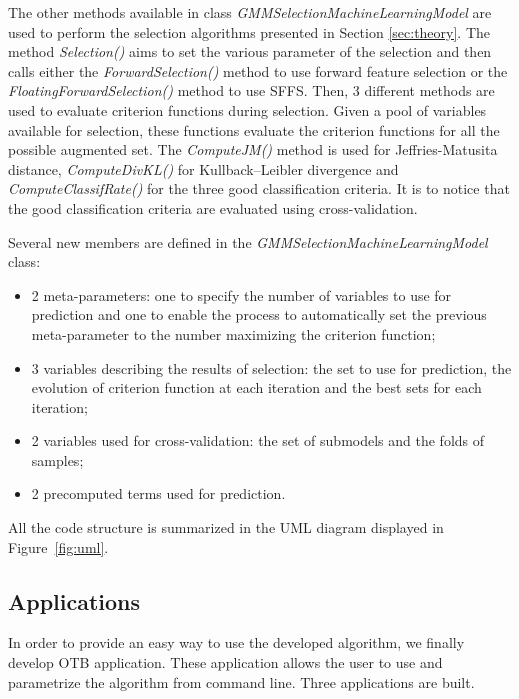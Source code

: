 \documentclass[a4paper,11pt,DIV=16]{scrartcl}
\begin{document}
        The other methods available in class \emph{GMMSelectionMachineLearningModel} are used to perform the selection algorithms presented in Section \ref{sec:theory}. The method \emph{Selection()} aims to set the various parameter of the selection and then calls either the \emph{ForwardSelection()} method to use forward feature selection or the \emph{FloatingForwardSelection()} method to use SFFS. Then, 3 different methods are used to evaluate criterion functions during selection. Given a pool of variables available for selection, these functions evaluate the criterion functions for all the possible augmented set. The \emph{ComputeJM()} method is used for Jeffries-Matusita distance, \emph{ComputeDivKL()} for Kullback–Leibler divergence and \emph{ComputeClassifRate()} for the three good classification criteria. It is to notice that the good classification criteria are evaluated using cross-validation.

        Several new members are defined in the \emph{GMMSelectionMachineLearningModel} class:
        \begin{itemize}
            \item 2 meta-parameters: one to specify the number of variables to use for prediction and one to enable the process to automatically set the previous meta-parameter to the number maximizing the criterion function;
            \item 3 variables describing the results of selection: the set to use for prediction, the evolution of criterion function at each iteration and the best sets for each iteration;
            \item 2 variables used for cross-validation: the set of submodels and the folds of samples;
            \item 2 precomputed terms used for prediction.
        \end{itemize}

        All the code structure is summarized in the UML diagram displayed in Figure~\ref{fig:uml}.

        \subsection{Applications}

        In order to provide an easy way to use the developed algorithm, we finally develop OTB application. These application allows the user to use and parametrize the algorithm from command line. Three applications are built.
\end{document}
